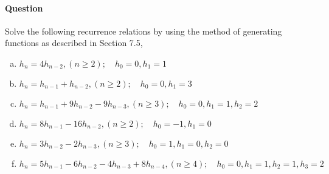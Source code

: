 \documentclass[UTF8]{article}
\begin{document}
\paragraph{Question}
Solve the following recurrence relations by using the method of generating functions as described in Section 7.5, 
\begin{enumerate}[(a)]
    \item $ h_{n} = 4h_{n - 2} , (n \geq 2); \quad h_{0} = 0, h_{1} = 1 $
    \item $ h_{n} = h_{n - 1} + h_{n - 2}, (n \geq 2); \quad h_{0} = 0, h_{1} = 3 $
    \item $ h_{n} = h_{n - 1} + 9h_{n - 2} - 9h_{n - 3}, (n \geq 3); \quad h_{0} = 0, h_{1} = 1, h_{2} = 2 $
    \item $ h_{n} = 8h_{n - 1} - 16h_{n - 2}, (n \geq 2); \quad h_{0} = -1, h_{1} = 0 $
    \item $ h_{n} = 3h_{n - 2} - 2h_{n - 3}, (n \geq 3); \quad h_{0} = 1, h_{1} = 0, h_{2} = 0 $
    \item $ h_{n} = 5h_{n - 1} - 6h_{n - 2} - 4h_{n - 3} + 8h_{n - 4}, (n \geq 4); \quad h_{0} = 0, h_{1} = 1, h_{2} = 1, h_{3} = 2 $
\end{enumerate}
\end{document}
